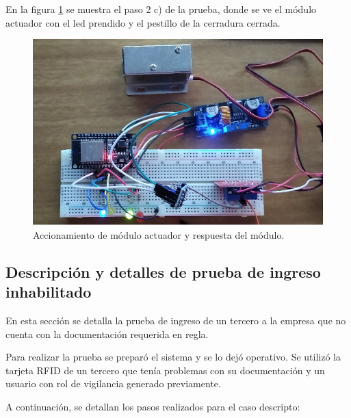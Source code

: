 En la figura \ref{fig:actuadorOK} se muestra el paso 2 c) de la prueba, donde se ve el módulo actuador con el led prendido y el pestillo de la cerradura cerrada.

\begin{figure}[h]
	\centering
	\includegraphics[width=1\textwidth]{./Figures/actuadorOK.png}
	\caption{Accionamiento de módulo actuador y respuesta del módulo.}
	\label{fig:actuadorOK}
\end{figure}

\clearpage
\subsection{Descripción y detalles de prueba de ingreso inhabilitado}

En esta sección se detalla la prueba de ingreso de un tercero a la empresa que no cuenta con la documentación requerida en regla.

Para realizar la prueba se preparó el sistema y se lo dejó operativo. Se utilizó la tarjeta RFID de un tercero que tenía problemas con su documentación y un usuario con rol de vigilancia generado previamente.

A continuación, se detallan los pasos realizados para el caso descripto:


